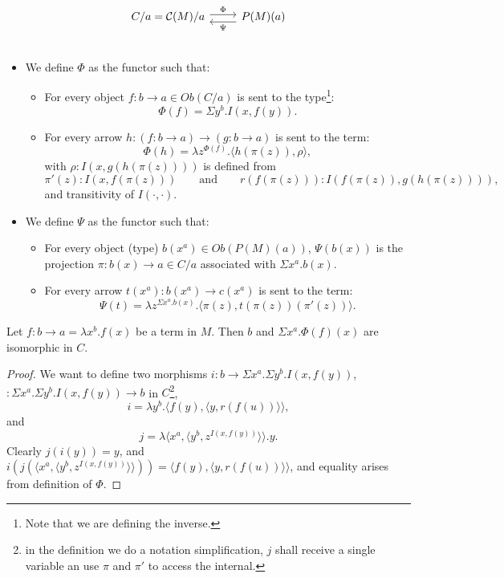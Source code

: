 \[
  \begin{tikzcd}
    C/a=\CC(M)/a\arrow[ shift left=.5ex, "\Phi"{name=T}]{r}{} &
    P(M)(a)\arrow[ shift left=1ex, "\Psi"{name=i}]{l}{} \\
  \end{tikzcd}
\]
\begin{itemize}
\item We define $\Phi$ as the functor such that:

  \begin{itemize}
  \item For every object $f:b\to a\in Ob(C/a)$ is sent to the type\footnote{Note that we are defining the inverse.}:
    $$\Phi(f)=\Sigma y^b.I(x,f(y)).$$
  \item For every arrow $h: (f:b\to a)\to (g:b\to a)$ is sent to the term:
    $$\Phi(h) = \lambda z^{\Phi(f)}. \langle h(\pi(z)), \rho\rangle,$$
    with $\rho : I(x,g(h(\pi(z))))$ is defined from $$\pi'(z) : I(x,f(\pi(z)))\qquad\text{and}\qquad r(f(\pi(z))) : I (f(\pi(z)), g(h(\pi(z)))),$$ and transitivity of $I(\cdot,\cdot)$.
  \end{itemize}

\item We define $\Psi$ as the functor such that:
  \begin{itemize}
  \item For every object (type) $b(x^a)\in Ob(P(M)(a))$, $\Psi(b(x))$ is the projection $\pi:b(x)\to a \in C/a$ associated with $\Sigma x^a. b(x)$.
  \item For every arrow $t(x^a): b(x^a) \to c(x^a)$ is sent to the term:
    $$\Psi(t) = \lambda z^{\Sigma x^a. b(x)}. \langle \pi(z), t(\pi(z))(\pi'(z))\rangle.$$
  \end{itemize}
\end{itemize}
\begin{lemma}\label{lemma:CM3}
  Let $f: b\to a= \lambda x^b.f(x)$ be a term in $M$. Then $b$ and $\Sigma x^a.\Phi(f)(x)$ are isomorphic in $C$.
\end{lemma}
\begin{proof}
  We want to define two morphisms $i:b \to \Sigma x^a. \Sigma y^b. I(x,f(y))$, $: \Sigma x^a. \Sigma y^b. I(x,f(y)) \to b$ in $C$\footnote{in the definition we do a notation simplification, $j$ shall receive a single variable an use $\pi$ and $\pi'$ to access the internal.},
  $$i = \lambda y^b. \langle f(y),\langle y, r(f(u))\rangle \rangle,$$
  and
  $$j = \lambda \langle x^a, \langle y^b, z^{I(x,f(y))} \rangle\rangle . y .$$
  Clearly $j(i(y)) = y$, and $i(j(\langle x^a, \langle y^b, z^{I(x,f(y))} \rangle\rangle)) = \langle f(y),\langle y, r(f(u))\rangle \rangle$, and equality arises from definition of $\Phi$.
\end{proof}

